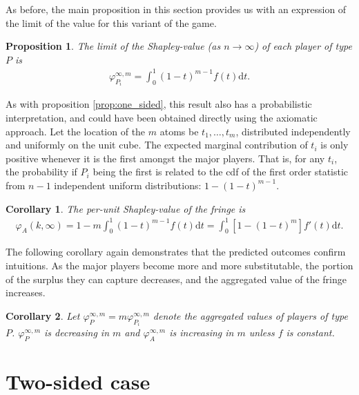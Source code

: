 \documentclass[a4paper]{article}
\newtheorem{proposition}{Proposition}
\newtheorem{corollary}{Corollary}
\newcommand{\dt}{\mathrm{d}t}
\begin{document}
As before, the main proposition in this section provides us with an expression of the limit of the value for this variant of the game.
\begin{proposition}
    \label{prop:multiple_platforms}
    The limit of the Shapley-value (as $n \to \infty$) of each player of type $P$ is
    \begin{align*}
        \varphi_{P_i}^{\infty, m} = \int_0^1 (1-t) ^ {m-1} f(t) \dt .
    \end{align*}
\end{proposition}

As with proposition \ref{prop:one_sided}, this result also has a probabilistic interpretation, and could have been obtained directly using the axiomatic approach. Let the location of the $m$ atoms be $t_1, \dots, t_m$, distributed independently and uniformly on the unit cube. The expected marginal contribution of $t_i$ is only positive whenever it is the first amongst the major players. That is, for any $t_i$, the probability if $P_i$ being the first is related to the cdf of the first order statistic from $n-1$ independent uniform distributions: $1 - (1-t)^{m-1}$.

\begin{corollary}
    \label{cor:multiple_platforms}
    The per-unit Shapley-value of the fringe is
    \begin{align*}
        \varphi_A(k, \infty) = 1 - m\int_0^1 (1-t) ^ {m-1} f(t) \dt = \int_0^1 [1 - (1-t)^m] f'(t) \dt .
    \end{align*}
\end{corollary}

The following corollary again demonstrates that the predicted outcomes confirm intuitions. As the major players become more and more substitutable, the portion of the surplus they can capture decreases, and the aggregated value of the fringe increases.

\begin{corollary}
    \label{cor:multiple_platforms_2}
    Let $\varphi_{P}^{\infty, m} = m\varphi_{P_i}^{\infty, m}$ denote the aggregated values of players of type $P$. $\varphi_{P}^{\infty, m}$ is decreasing in $m$ and $\varphi_{A}^{\infty, m}$ is increasing in $m$ unless $f$ is constant.
\end{corollary}

\section{Two-sided case}
\end{document}
